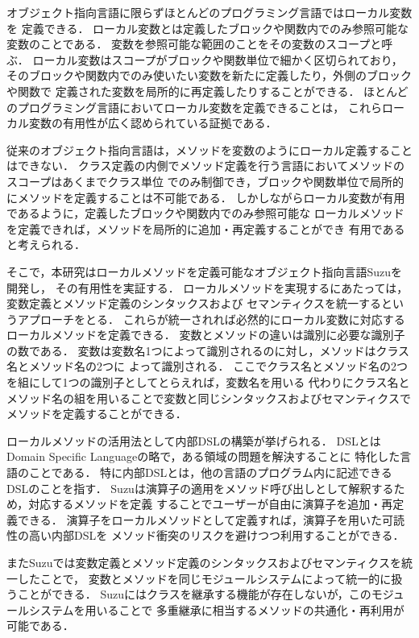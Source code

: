 \documentclass[a4paper,11pt,dvipdfmx]{jreport}
\begin{document}
オブジェクト指向言語に限らずほとんどのプログラミング言語ではローカル変数を
定義できる．
ローカル変数とは定義したブロックや関数内でのみ参照可能な変数のことである．
変数を参照可能な範囲のことをその変数のスコープと呼ぶ．
ローカル変数はスコープがブロックや関数単位で細かく区切られており，
そのブロックや関数内でのみ使いたい変数を新たに定義したり，外側のブロックや関数で
定義された変数を局所的に再定義したりすることができる．
ほとんどのプログラミング言語においてローカル変数を定義できることは，
これらローカル変数の有用性が広く認められている証拠である．

従来のオブジェクト指向言語は，メソッドを変数のようにローカル定義することはできない．
クラス定義の内側でメソッド定義を行う言語においてメソッドのスコープはあくまでクラス単位
でのみ制御でき，ブロックや関数単位で局所的にメソッドを定義することは不可能である．
しかしながらローカル変数が有用であるように，定義したブロックや関数内でのみ参照可能な
ローカルメソッドを定義できれば，メソッドを局所的に追加・再定義することができ
有用であると考えられる．

そこで，本研究はローカルメソッドを定義可能なオブジェクト指向言語Suzuを開発し，
その有用性を実証する．
ローカルメソッドを実現するにあたっては，変数定義とメソッド定義のシンタックスおよび
セマンティクスを統一するというアプローチをとる．
これらが統一されれば必然的にローカル変数に対応するローカルメソッドを定義できる．
変数とメソッドの違いは識別に必要な識別子の数である．
変数は変数名1つによって識別されるのに対し，メソッドはクラス名とメソッド名の2つに
よって識別される．
ここでクラス名とメソッド名の2つを組にして1つの識別子としてとらえれば，変数名を用いる
代わりにクラス名とメソッド名の組を用いることで変数と同じシンタックスおよびセマンティクスで
メソッドを定義することができる．

ローカルメソッドの活用法として内部DSLの構築が挙げられる．
DSLとはDomain Specific Languageの略で，ある領域の問題を解決することに
特化した言語のことである．
特に内部DSLとは，他の言語のプログラム内に記述できるDSLのことを指す．
Suzuは演算子の適用をメソッド呼び出しとして解釈するため，対応するメソッドを定義
することでユーザーが自由に演算子を追加・再定義できる．
演算子をローカルメソッドとして定義すれば，演算子を用いた可読性の高い内部DSLを
メソッド衝突のリスクを避けつつ利用することができる．

またSuzuでは変数定義とメソッド定義のシンタックスおよびセマンティクスを統一したことで，
変数とメソッドを同じモジュールシステムによって統一的に扱うことができる．
Suzuにはクラスを継承する機能が存在しないが，このモジュールシステムを用いることで
多重継承に相当するメソッドの共通化・再利用が可能である．
\end{document}
